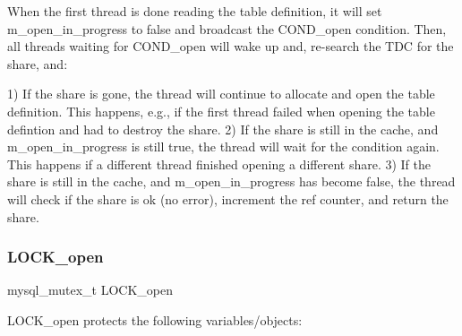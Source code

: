 When the first thread is done reading the table definition, it will set m\+\_\+open\+\_\+in\+\_\+progress to false and broadcast the C\+O\+N\+D\+\_\+open condition. Then, all threads waiting for C\+O\+N\+D\+\_\+open will wake up and, re-\/search the T\+DC for the share, and\+:

1) If the share is gone, the thread will continue to allocate and open the table definition. This happens, e.\+g., if the first thread failed when opening the table defintion and had to destroy the share. 2) If the share is still in the cache, and m\+\_\+open\+\_\+in\+\_\+progress is still true, the thread will wait for the condition again. This happens if a different thread finished opening a different share. 3) If the share is still in the cache, and m\+\_\+open\+\_\+in\+\_\+progress has become false, the thread will check if the share is ok (no error), increment the ref counter, and return the share. \mbox{\label{group__Data__Dictionary_ga99c8e1e3e72cd74032d5f11c486911fd}} 
\subsubsection{\texorpdfstring{L\+O\+C\+K\+\_\+open}{LOCK\_open}}
{\footnotesize\ttfamily mysql\+\_\+mutex\+\_\+t L\+O\+C\+K\+\_\+open}

L\+O\+C\+K\+\_\+open protects the following variables/objects\+:

